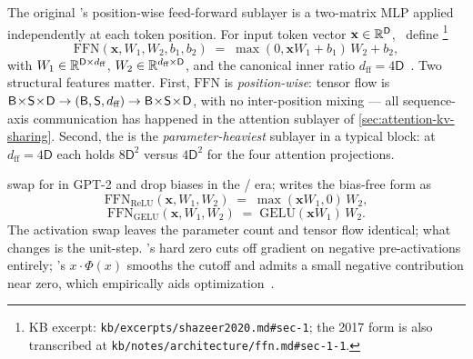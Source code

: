 The original 's position-wise feed-forward sublayer is a
two-matrix MLP applied independently at each token position. For input
token vector $\mathbf{x} \in \mathbb{R}^{\mathsf{D}}$,~\citet{vaswani2017}
define%
\footnote{KB excerpt: \texttt{kb/excerpts/shazeer2020.md\#sec-1}; the
2017 form is also transcribed at
\texttt{kb/notes/architecture/ffn.md\#sec-1-1}.}
\begin{equation}
  \mathrm{FFN}(\mathbf{x}, W_1, W_2, b_1, b_2)
  \;=\; \max(0, \mathbf{x} W_1 + b_1)\, W_2 + b_2,
  \tag{Vaswani--Eq.~2}
  \label{eq:vaswani-ffn}
\end{equation}
with $W_1 \in \mathbb{R}^{\mathsf{D} \times d_{\text{ff}}}$,
$W_2 \in \mathbb{R}^{d_{\text{ff}} \times \mathsf{D}}$, and the canonical
inner ratio $d_{\text{ff}} = 4\mathsf{D}$~\citep[\S 3.3]{vaswani2017}.
Two structural features matter. First, $\mathrm{FFN}$ is
\emph{position-wise}: tensor flow is $\BSH \to (\mathsf{B}, \mathsf{S},
d_{\text{ff}}) \to \BSH$, with no inter-position mixing --- all
sequence-axis communication has happened in the attention sublayer of
\cref{sec:attention-kv-sharing}. Second, the  is the
\emph{parameter-heaviest} sublayer in a typical block: at $d_{\text{ff}}
= 4\mathsf{D}$ each  holds $8\mathsf{D}^2$  versus
$4\mathsf{D}^2$ for the four attention projections.

\citet{radford2019-gpt2} swap  for  in GPT-2 and drop biases in
the / era; \citet{shazeer2020} writes the bias-free form
as~\citep[\S 1, Eq.~2]{shazeer2020}
\begin{equation}
  \mathrm{FFN}_{\mathrm{ReLU}}(\mathbf{x}, W_1, W_2)
  \;=\; \max(\mathbf{x} W_1, 0)\, W_2,
  \tag{Shazeer--Eq.~2}
  \label{eq:relu-ffn}
\end{equation}
\begin{equation}
  \mathrm{FFN}_{\mathrm{GELU}}(\mathbf{x}, W_1, W_2)
  \;=\; \mathrm{GELU}(\mathbf{x} W_1)\, W_2.
  \tag{Shazeer--Eq.~3}
  \label{eq:gelu-ffn}
\end{equation}
The activation swap leaves the parameter count and tensor flow
identical; what changes is the unit-step. 's hard zero cuts off
gradient on negative pre-activations entirely; 's
$x \cdot \Phi(x)$ smooths the cutoff and admits a small negative
contribution near zero, which empirically aids
optimization~\citep[\S 2.3]{radford2019-gpt2}.

